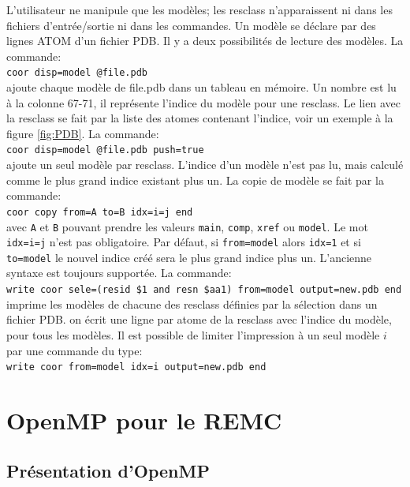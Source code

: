 L'utilisateur ne manipule que les modèles; les resclass n'apparaissent ni dans les fichiers d'entrée/sortie ni dans les commandes. Un modèle se déclare par des lignes ATOM d'un fichier PDB. Il y a deux possibilités de lecture des modèles. La commande:\\
\verb!coor disp=model @file.pdb!\\
ajoute chaque modèle de file.pdb dans un tableau en mémoire. Un nombre est lu à la colonne 67-71, il représente l'indice du modèle pour une resclass. Le lien avec la resclass se fait par la liste des atomes contenant l'indice, voir un exemple à la figure \ref{fig:PDB}. La commande:\\
\verb!coor disp=model @file.pdb push=true!\\
ajoute un seul modèle par resclass. L'indice d'un modèle n'est pas lu, mais calculé comme le plus grand indice existant plus un. 
La copie de modèle se fait par la commande:\\
\verb!coor copy from=A to=B idx=i=j end!\\
avec \verb!A! et \verb!B!  pouvant prendre les valeurs \verb!main!, \verb!comp!, \verb!xref! ou \verb!model!.
Le mot \verb!idx=i=j! n'est pas obligatoire. Par défaut, si \verb!from=model! alors \verb!idx=1! et si \verb!to=model! le nouvel indice créé sera le plus grand indice plus un. L'ancienne syntaxe est toujours supportée. La commande:\\ 
\verb!write coor sele=(resid $1 and resn $aa1) from=model output=new.pdb end!\\
imprime les modèles de chacune des resclass définies par la sélection dans un fichier PDB. on écrit une ligne par atome de la resclass avec l'indice du modèle, pour tous les modèles. 
Il est possible de limiter l'impression à un seul modèle $i$ par une commande du type:\\
\verb!write coor from=model idx=i output=new.pdb end!\\

\section{OpenMP pour le REMC}
\subsection{Présentation d'OpenMP}

